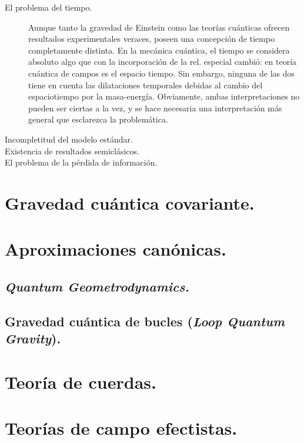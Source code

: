 \documentclass[11pt,a4paper,titlepage]{article}
\begin{document}
\begin{description}
\item[El problema del tiempo.]{Aunque tanto la gravedad de Einstein como las teorías cuánticas ofrecen resultados experimentales veraces, poseen una concepción de tiempo completamente distinta. En la mecánica cuántica, el tiempo se considera absoluto algo que con la incorporación de la rel. especial cambió: en teoría cuántica de campos es el espacio tiempo. Sin embargo, ninguna de las dos tiene en cuenta las dilataciones temporales debidas al cambio del espaciotiempo por la masa-energía. Obviamente, ambas interpretaciones no pueden ser ciertas a la vez, y se hace necesaria una interpretación más general que esclarezca la problemática.}
\item[Incompletitud del modelo estándar.]{}
\item[Existencia de resultados semiclásicos.]{}
\item[El problema de la pérdida de información.]{}
\end{description}
%
%
%
%
\newpage
\section{Gravedad cuántica covariante.} %

%
%
%
%
\newpage
\section{Aproximaciones canónicas.} %
\subsection{\textit{Quantum Geometrodynamics.}}

\subsection{Gravedad cuántica de bucles (\textit{Loop Quantum Gravity}).}

%
%
%
%
\section{Teoría de cuerdas.}

%
%
%
%
\section{Teorías de campo efectistas.} %
\end{document}
